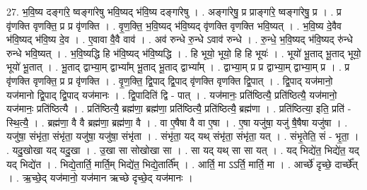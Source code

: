 \documentclass[17pt]{extarticle}
\begin{document}
27. भ॒वि॒ष्य दङ्गा॑रे॒ ष्वङ्गा॑रेषु भवि॒ष्यद् भ॑वि॒ष्य दङ्गा॑रेषु । . अङ्गा॑रेषु॒ प्र प्राङ्गा॑रे॒ ष्वङ्गा॑रेषु॒ प्र । . प्र वृ॑णक्ति वृणक्ति॒ प्र प्र वृ॑णक्ति । . वृ॒ण॒क्ति॒ भ॒वि॒ष्यद् भ॑वि॒ष्यद् वृ॑णक्ति वृणक्ति भवि॒ष्यत् । . भ॒वि॒ष्य दे॒वैव भ॑वि॒ष्यद् भ॑वि॒ष्य दे॒व । . ए॒वावा वै॒वै वाव॑ । . अव॑ रुन्धे रु॒न्धे ऽवाव॑ रुन्धे । . रु॒न्धे॒ भ॒वि॒ष्यद् भ॑वि॒ष्यद् रु॑न्धे रुन्धे भवि॒ष्यत् । . भ॒वि॒ष्यद्धि हि भ॑वि॒ष्यद् भ॑वि॒ष्यद्धि । . हि भूयो॒ भूयो॒ हि हि भूयः॑ । . भूयो॑ भू॒ताद् भू॒ताद् भूयो॒ भूयो॑ भू॒तात् । . भू॒ताद् द्वाभ्या॒म् द्वाभ्या᳚म् भू॒ताद् भू॒ताद् द्वाभ्या᳚म् । . द्वाभ्या॒म् प्र प्र द्वाभ्या॒म् द्वाभ्या॒म् प्र । . प्र वृ॑णक्ति वृणक्ति॒ प्र प्र वृ॑णक्ति । . वृ॒ण॒क्ति॒ द्वि॒पाद् द्वि॒पाद् वृ॑णक्ति वृणक्ति द्वि॒पात् । . द्वि॒पाद् यज॑मानो॒ यज॑मानो द्वि॒पाद् द्वि॒पाद् यज॑मानः । . द्वि॒पादिति॑ द्वि - पात् । . यज॑मानः॒ प्रति॑ष्ठित्यै॒ प्रति॑ष्ठित्यै॒ यज॑मानो॒ यज॑मानः॒ प्रति॑ष्ठित्यै । . प्रति॑ष्ठित्यै॒ ब्रह्म॑णा॒ ब्रह्म॑णा॒ प्रति॑ष्ठित्यै॒ प्रति॑ष्ठित्यै॒ ब्रह्म॑णा । . प्रति॑ष्ठित्या॒ इति॒ प्रति॑ - स्थि॒त्यै॒ । . ब्रह्म॑णा॒ वै वै ब्रह्म॑णा॒ ब्रह्म॑णा॒ वै । . वा ए॒षैषा वै वा ए॒षा । . ए॒षा यजु॑षा॒ यजु॑ षै॒षैषा यजु॑षा । . यजु॑षा॒ संभृ॑ता॒ संभृ॑ता॒ यजु॑षा॒ यजु॑षा॒ संभृ॑ता । . संभृ॑ता॒ यद् यथ् संभृ॑ता॒ संभृ॑ता॒ यत् । . संभृ॒तेति॒ सं - भृ॒ता॒ । . यदु॒खोखा यद् यदु॒खा । . उ॒खा सा सोखोखा सा । . सा यद् यथ् सा सा यत् । . यद् भिद्ये॑त॒ भिद्ये॑त॒ यद् यद् भिद्ये॑त । . भिद्ये॒तार्ति॒ मार्ति॒म् भिद्ये॑त॒ भिद्ये॒तार्ति᳚म् । . आर्ति॒ मा ऽऽर्ति॒ मार्ति॒ मा । . आर्च्छे॑ दृच्छे॒ दार्च्छे᳚त् । . ऋ॒च्छे॒द् यज॑मानो॒ यज॑मान ऋच्छे दृच्छे॒द् यज॑मानः । \newline
\end{document}
